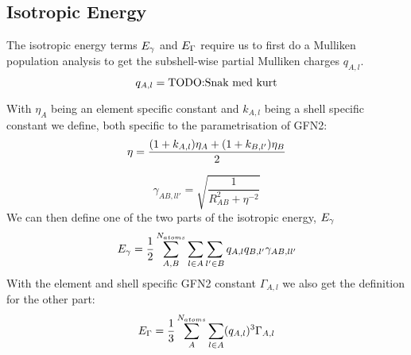 \subsection{Isotropic Energy}
The isotropic energy terms $\E{\gamma}$ and $\E{\Gamma}$ require us to first do a Mulliken population analysis to get the subshell-wise partial Mulliken charges $q_{A,l}$.
\begin{equation}
    q_{A,l} = \text{TODO:Snak med kurt}\\
\end{equation}

With $\eta_A$ being an element specific constant and $k_{A,l}$ being a shell specific constant we define, both specific to the parametrisation of GFN2:
\begin{equation}
    \eta = \frac{(1+k_{A,l})\eta_A+(1+k_{B,l'})\eta_B}{2}\\
\end{equation}

\begin{equation}
    \gamma_{AB,ll'} = \sqrt{\frac{1}{R_{AB}^2+\eta^{-2}}}
\end{equation}
We can then define one of the two parts of the isotropic energy, $\E{\gamma}$
\begin{equation}
    \E{\gamma} = \frac{1}{2}\sum_{A,B}^{N_{atoms}}\sum_{l\in A}\sum_{l'\in B}q_{A,l}q_{B,l'}\gamma_{AB,ll'}\label{eq:gamma}
\end{equation}
With the element and shell specific GFN2 constant $\Gamma_{A,l}$ we also get the definition for the other part:
\begin{equation}
    \E{\Gamma} = \frac{1}{3}\sum_A^{N_{atoms}}\sum_{l\in A}(q_{A,l})^3\Gamma_{A,l} \label{eq:Gamma}
\end{equation}

